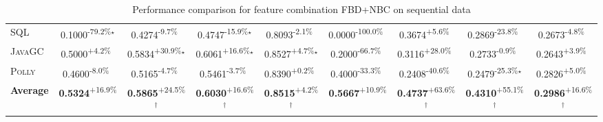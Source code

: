 \begin{table}[htbp]
\begin{tabular}{l|cccc|cccc}
\textsc{SQL} & \cellcolor{red!30}0.1000\textsuperscript{-79.2\%}$^\star$ & \cellcolor{red!30}0.4274\textsuperscript{-9.7\%}$^{\,\,\,}$ & \cellcolor{red!30}0.4747\textsuperscript{-15.9\%}$^\star$ & \cellcolor{red!30}0.8093\textsuperscript{-2.1\%}$^{\,\,\,}$ & \cellcolor{red!30}0.0000\textsuperscript{-100.0\%}$^{\,\,\,}$ & \cellcolor{green!30}0.3674\textsuperscript{+5.6\%}$^{\,\,\,}$ & \cellcolor{red!30}0.2869\textsuperscript{-23.8\%}$^{\,\,\,}$ & \cellcolor{red!30}0.2673\textsuperscript{-4.8\%}$^{\,\,\,}$ \\
\textsc{JavaGC} & \cellcolor{green!30}0.5000\textsuperscript{+4.2\%}$^{\,\,\,}$ & \cellcolor{green!30}0.5834\textsuperscript{+30.9\%}$^\star$ & \cellcolor{green!30}0.6061\textsuperscript{+16.6\%}$^\star$ & \cellcolor{green!30}0.8527\textsuperscript{+4.7\%}$^\star$ & \cellcolor{red!30}0.2000\textsuperscript{-66.7\%}$^{\,\,\,}$ & \cellcolor{green!30}0.3116\textsuperscript{+28.0\%}$^{\,\,\,}$ & \cellcolor{red!30}0.2733\textsuperscript{-0.9\%}$^{\,\,\,}$ & \cellcolor{green!30}0.2643\textsuperscript{+3.9\%}$^{\,\,\,}$ \\
\textsc{Polly} & \cellcolor{red!30}0.4600\textsuperscript{-8.0\%}$^{\,\,\,}$ & \cellcolor{red!30}0.5165\textsuperscript{-4.7\%}$^{\,\,\,}$ & \cellcolor{red!30}0.5461\textsuperscript{-3.7\%}$^{\,\,\,}$ & \cellcolor{green!30}0.8390\textsuperscript{+0.2\%}$^{\,\,\,}$ & \cellcolor{red!30}0.4000\textsuperscript{-33.3\%}$^{\,\,\,}$ & \cellcolor{red!30}0.2408\textsuperscript{-40.6\%}$^{\,\,\,}$ & \cellcolor{red!30}0.2479\textsuperscript{-25.3\%}$^\star$ & \cellcolor{green!30}0.2826\textsuperscript{+5.0\%}$^{\,\,\,}$ \\
\hline
\textbf{Average} & \cellcolor{green!30}\textbf{0.5324}\textsuperscript{+16.9\%}$^{\,\,\,}$ & \cellcolor{green!30}\textbf{0.5865}\textsuperscript{+24.5\%}$^\dagger$ & \cellcolor{green!30}\textbf{0.6030}\textsuperscript{+16.6\%}$^\dagger$ & \cellcolor{green!30}\textbf{0.8515}\textsuperscript{+4.2\%}$^\dagger$ & \cellcolor{green!30}\textbf{0.5667}\textsuperscript{+10.9\%}$^{\,\,\,}$ & \cellcolor{green!30}\textbf{0.4737}\textsuperscript{+63.6\%}$^\dagger$ & \cellcolor{green!30}\textbf{0.4310}\textsuperscript{+55.1\%}$^\dagger$ & \cellcolor{green!30}\textbf{0.2986}\textsuperscript{+16.6\%}$^\dagger$ \\
\hline
\end{tabular}
\caption{Performance comparison for feature combination FBD+NBC on sequential data}
\label{tab:combo_FBD_NBC_performance_sequential}
\end{table}